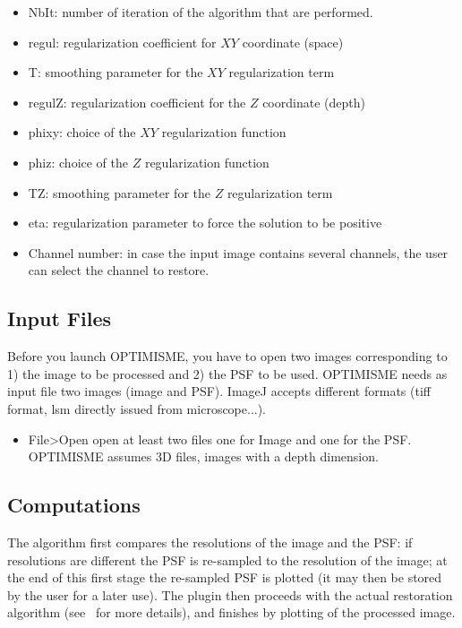 \documentclass[12pt, a4paper]{scrartcl}
\begin{document}
 \begin{itemize}
 \item  NbIt: number of iteration of the algorithm that are performed.
 \item  regul: regularization coefficient for $XY$ coordinate (space)
 \item  T:  smoothing parameter for the $XY$ regularization term
 \item  regulZ: regularization coefficient for the $Z$ coordinate (depth)
 \item  phixy: choice of the $XY$ regularization function
 \item  phiz: choice of the $Z$ regularization function
 \item  TZ: smoothing parameter for the $Z$ regularization term
 \item  eta: regularization parameter to force the solution to be positive
 \item  Channel number: in case the input image contains several channels, the user can select the channel to restore.
  \end{itemize}


\subsection{Input Files}
Before you launch OPTIMISME, you have to open two images corresponding to 1) the image to be processed and 2) the PSF to be used.
OPTIMISME needs as input file two images (image and PSF). ImageJ accepts different formats (tiff format, lsm directly issued from microscope...).
\begin{itemize}

 \item File>Open open at least two files one for Image and one for the PSF.
OPTIMISME assumes 3D files, images with a depth dimension.

 \end{itemize}




\subsection{Computations}
The algorithm first compares the resolutions of the image and the PSF: if resolutions are different the  PSF is re-sampled to the resolution of the image; at the end of this first stage the re-sampled PSF is plotted (it may then be stored by the user for a later use).
The plugin then proceeds with the actual restoration algorithm (see~\cite{chouzenoux:hal-01278102} for more details), and finishes by plotting of the processed image.
\end{document}
